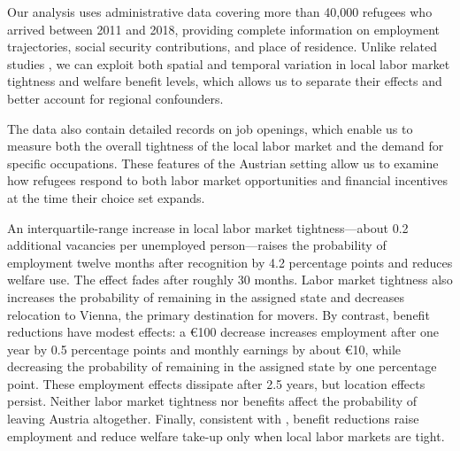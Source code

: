 Our analysis uses administrative data covering more than 40,000 refugees who arrived between 2011 and 2018, providing complete information on employment trajectories, social security contributions, and place of residence. Unlike related studies \citep{ferwerda2023, dustmann2024, azlor_local_2020}, we can exploit both spatial and temporal variation in local labor market tightness and welfare benefit levels, which allows us to separate their effects and better account for regional confounders.

The data also contain detailed records on job openings, which enable us to measure both the overall tightness of the local labor market and the demand for specific occupations. These features of the Austrian setting allow us to examine how refugees respond to both labor market opportunities and financial incentives at the time their choice set expands.

An interquartile-range increase in local labor market tightness—about 0.2 additional vacancies per unemployed person—raises the probability of employment twelve months after recognition by 4.2 percentage points and reduces welfare use. The effect fades after roughly 30 months. Labor market tightness also increases the probability of remaining in the assigned state and decreases relocation to Vienna, the primary destination for movers. By contrast, benefit reductions have modest effects: a €100 decrease increases employment after one year by 0.5 percentage points and monthly earnings by about €10, while decreasing the probability of remaining in the assigned state by one percentage point. These employment effects dissipate after 2.5 years, but location effects persist. Neither labor market tightness nor benefits affect the probability of leaving Austria altogether. Finally, consistent with \citet{dustmann2024}, benefit reductions raise employment and reduce welfare take-up only when local labor markets are tight.


